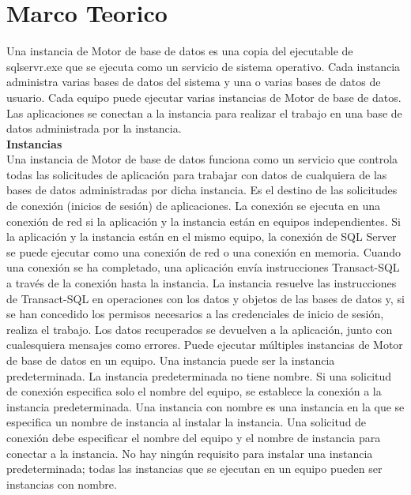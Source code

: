 \section{Marco Teorico} 


Una instancia de Motor de base de datos es una copia del ejecutable de sqlservr.exe que se ejecuta como un servicio de sistema operativo. Cada instancia administra varias bases de datos del sistema y una o varias bases de datos de usuario. Cada equipo puede ejecutar varias instancias de Motor de base de datos. Las aplicaciones se conectan a la instancia para realizar el trabajo en una base de datos administrada por la instancia.\\

\textbf{Instancias}\\

Una instancia de Motor de base de datos funciona como un servicio que controla todas las solicitudes de aplicación para trabajar con datos de cualquiera de las bases de datos administradas por dicha instancia. Es el destino de las solicitudes de conexión (inicios de sesión) de aplicaciones. La conexión se ejecuta en una conexión de red si la aplicación y la instancia están en equipos independientes. Si la aplicación y la instancia están en el mismo equipo, la conexión de SQL Server se puede ejecutar como una conexión de red o una conexión en memoria. Cuando una conexión se ha completado, una aplicación envía instrucciones Transact-SQL a través de la conexión hasta la instancia. La instancia resuelve las instrucciones de Transact-SQL en operaciones con los datos y objetos de las bases de datos y, si se han concedido los permisos necesarios a las credenciales de inicio de sesión, realiza el trabajo. Los datos recuperados se devuelven a la aplicación, junto con cualesquiera mensajes como errores.
Puede ejecutar múltiples instancias de Motor de base de datos en un equipo. Una instancia puede ser la instancia predeterminada. La instancia predeterminada no tiene nombre. Si una solicitud de conexión especifica solo el nombre del equipo, se establece la conexión a la instancia predeterminada. Una instancia con nombre es una instancia en la que se especifica un nombre de instancia al instalar la instancia. Una solicitud de conexión debe especificar el nombre del equipo y el nombre de instancia para conectar a la instancia. No hay ningún requisito para instalar una instancia predeterminada; todas las instancias que se ejecutan en un equipo pueden ser instancias con nombre.

